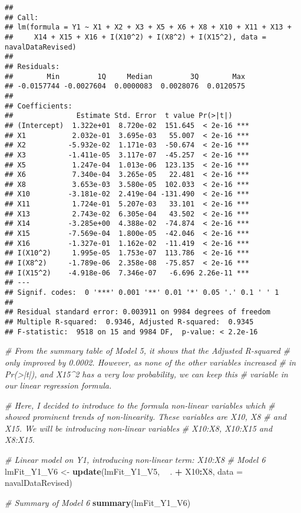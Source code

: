 \documentclass[
]{article}
\newenvironment{Shaded}{\begin{snugshade}}{\end{snugshade}}
\newcommand{\CommentTok}[1]{\textcolor[rgb]{0.56,0.35,0.01}{\textit{#1}}}
\newcommand{\DataTypeTok}[1]{\textcolor[rgb]{0.13,0.29,0.53}{#1}}
\newcommand{\KeywordTok}[1]{\textcolor[rgb]{0.13,0.29,0.53}{\textbf{#1}}}
\newcommand{\NormalTok}[1]{#1}
\newcommand{\OperatorTok}[1]{\textcolor[rgb]{0.81,0.36,0.00}{\textbf{#1}}}
\newcommand{\StringTok}[1]{\textcolor[rgb]{0.31,0.60,0.02}{#1}}
\begin{document}
\begin{verbatim}
## 
## Call:
## lm(formula = Y1 ~ X1 + X2 + X3 + X5 + X6 + X8 + X10 + X11 + X13 + 
##     X14 + X15 + X16 + I(X10^2) + I(X8^2) + I(X15^2), data = navalDataRevised)
## 
## Residuals:
##        Min         1Q     Median         3Q        Max 
## -0.0157744 -0.0027604  0.0000083  0.0028076  0.0120575 
## 
## Coefficients:
##               Estimate Std. Error  t value Pr(>|t|)    
## (Intercept)  1.322e+01  8.720e-02  151.645  < 2e-16 ***
## X1           2.032e-01  3.695e-03   55.007  < 2e-16 ***
## X2          -5.932e-02  1.171e-03  -50.674  < 2e-16 ***
## X3          -1.411e-05  3.117e-07  -45.257  < 2e-16 ***
## X5           1.247e-04  1.013e-06  123.135  < 2e-16 ***
## X6           7.340e-04  3.265e-05   22.481  < 2e-16 ***
## X8           3.653e-03  3.580e-05  102.033  < 2e-16 ***
## X10         -3.181e-02  2.419e-04 -131.490  < 2e-16 ***
## X11          1.724e-01  5.207e-03   33.101  < 2e-16 ***
## X13          2.743e-02  6.305e-04   43.502  < 2e-16 ***
## X14         -3.285e+00  4.388e-02  -74.874  < 2e-16 ***
## X15         -7.569e-04  1.800e-05  -42.046  < 2e-16 ***
## X16         -1.327e-01  1.162e-02  -11.419  < 2e-16 ***
## I(X10^2)     1.995e-05  1.753e-07  113.786  < 2e-16 ***
## I(X8^2)     -1.789e-06  2.358e-08  -75.857  < 2e-16 ***
## I(X15^2)    -4.918e-06  7.346e-07   -6.696 2.26e-11 ***
## ---
## Signif. codes:  0 '***' 0.001 '**' 0.01 '*' 0.05 '.' 0.1 ' ' 1
## 
## Residual standard error: 0.003911 on 9984 degrees of freedom
## Multiple R-squared:  0.9346, Adjusted R-squared:  0.9345 
## F-statistic:  9518 on 15 and 9984 DF,  p-value: < 2.2e-16
\end{verbatim}

\begin{Shaded}
\begin{Highlighting}[]
\CommentTok{# From the summary table of Model 5, it shows that the Adjusted R-squared }
\CommentTok{# only improved by 0.0002. However, as none of the other variables increased }
\CommentTok{# in Pr(>|t|), and X15^2 has a very low probability, we can keep this}
\CommentTok{# variable in our linear regression formula.}

\CommentTok{# Here, I decided to introduce to the formula non-linear variables which}
\CommentTok{# showed prominent trends of non-linearity. These variables are X10, X8}
\CommentTok{# and X15. We will be introducing non-linear variables }
\CommentTok{# X10:X8, X10:X15 and X8:X15.}

\CommentTok{# Linear model on Y1, introducing non-linear term: X10:X8}
\CommentTok{# Model 6}
\NormalTok{lmFit_Y1_V6 <-}\StringTok{ }\KeywordTok{update}\NormalTok{(lmFit_Y1_V5, }\OperatorTok{~}\StringTok{ }\NormalTok{. }\OperatorTok{+}\StringTok{ }\NormalTok{X10}\OperatorTok{:}\NormalTok{X8, }\DataTypeTok{data =}\NormalTok{ navalDataRevised)}

\CommentTok{# Summary of Model 6}
\KeywordTok{summary}\NormalTok{(lmFit_Y1_V6)}
\end{Highlighting}
\end{Shaded}
\end{document}
